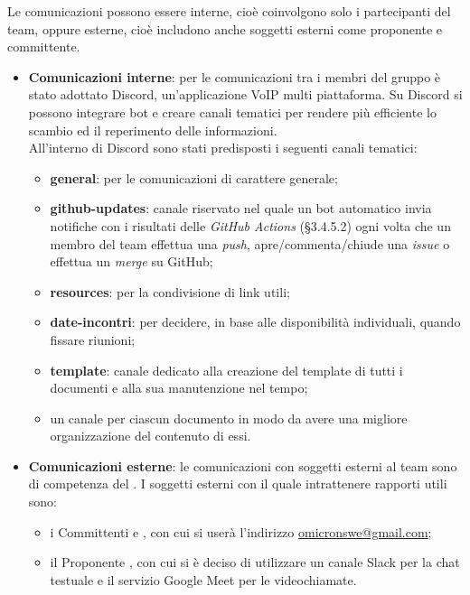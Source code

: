 Le comunicazioni possono essere interne, cioè coinvolgono solo i partecipanti del team, oppure esterne, cioè includono anche soggetti esterni come proponente e committente.
\begin{itemize}
	\item \textbf{Comunicazioni interne}: per le comunicazioni tra i membri del gruppo è stato adottato Discord, un'applicazione VoIP multi piattaforma. Su Discord si possono integrare bot e creare canali tematici per rendere più efficiente lo scambio ed il reperimento delle informazioni. \\
	All'interno di Discord sono stati predisposti i seguenti canali tematici:
	\begin{itemize}
	\item \textbf{general}: per le comunicazioni di carattere generale;
	\item \textbf{github-updates}: canale riservato nel quale un bot automatico invia notifiche con i risultati delle \textit{GitHub Actions} (§3.4.5.2) ogni volta che un membro del team effettua una \textit{push}, apre/commenta/chiude una \textit{issue} o effettua un \textit{merge} su GitHub;
	\item \textbf{resources}: per la condivisione di link utili;
	\item \textbf{date-incontri}: per decidere, in base alle disponibilità individuali, quando fissare riunioni;
	\item \textbf{template}: canale dedicato alla creazione del template di tutti i documenti e alla sua manutenzione nel tempo;
	\item un canale per ciascun documento in modo da avere una migliore organizzazione del contenuto di essi. 
	\end{itemize}
	\item \textbf{Comunicazioni esterne}: le comunicazioni con soggetti esterni al team sono di competenza del \respProg . I soggetti esterni con il quale intrattenere rapporti utili sono:
	\begin{itemize}
		\item i Committenti \textbf{\VT} e \textbf{\CR}, con cui si userà l'indirizzo \url{omicronswe@gmail.com};
		\item il Proponente \textbf{\Proponente}, con cui si è deciso di utilizzare un canale Slack per la chat testuale e il servizio Google Meet per le videochiamate.
	\end{itemize}
\end{itemize}

